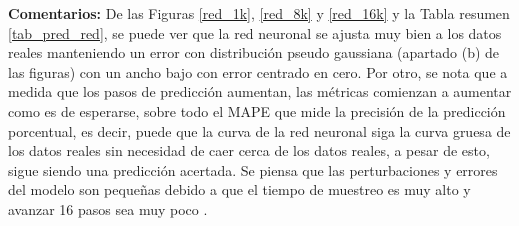 \documentclass[12pt]{article}
\begin{document}
\begin{itemize}
	\textbf{Comentarios:}
	De las Figuras \ref{red_1k}, \ref{red_8k} y \ref{red_16k} y la Tabla resumen \ref{tab_pred_red}, se puede ver que la red neuronal se ajusta muy bien a los datos reales manteniendo un error con distribución pseudo gaussiana (apartado (b) de las figuras) con un ancho bajo con error centrado en cero.  Por otro, se nota que a medida que los pasos de predicción aumentan, las métricas comienzan a aumentar como es de esperarse, sobre todo el MAPE que mide la precisión de la predicción porcentual, es decir, puede que la curva de la red neuronal siga la curva gruesa de los datos reales sin necesidad de caer cerca de los datos reales, a pesar de esto, sigue siendo una predicción acertada. Se piensa que las perturbaciones y errores del modelo son pequeñas debido a que el tiempo de muestreo es muy alto y avanzar 16 pasos sea muy poco .


\end{itemize}
\end{document}
